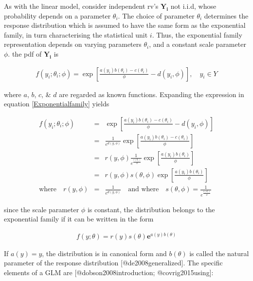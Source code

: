\documentclass[]{article}
\begin{document}
As with the linear model, consider independent rv's \(\mathbf{Y_i}\) not
i.i.d, whose probability depends on a parameter \(\theta_i\). The choice
of parameter \(\theta_i\) determines the response distribution which is
assumed to have the same form as the exponential family, in turn
characterising the statistical unit \(i\). Thus, the exponential family
representation depends on varying parameters \(\theta_i\), and a
constant scale parameter \(\phi\). the pdf of \(\mathbf{Y_i}\) is

\singlespacing

\begin{eqnarray}\label{Exponentialfamily}
f(y_i;\theta_i;\phi) = \exp\left[\frac{a(y_i)b(\theta_i) -c(\theta_i)}{\phi}-d(y_i,\phi)\right], \quad y_i \in Y 
\end{eqnarray} \doublespacing

where \(a\), \(b\), \(c\), \& \(d\) are regarded as known functions.
Expanding the expression in equation \ref{Exponentialfamily} yields

\singlespacing

\begin{eqnarray}\label{Exponentialfamilies}
f(y_i;\theta_i;\phi) &=& \exp\left[\frac{a(y_i)b(\theta_i) -c(\theta_i)}{\phi}-d(y_i,\phi)\right] \nonumber\\
 &=& \frac{1}{e^{d(y,\phi)}}\exp\left[\frac{a(y_i)b(\theta_i) -c(\theta_i)}{\phi}\right] \nonumber\\
 &=& r(y,\phi)\frac{1}{e^{\frac{c(\theta_i)}{\phi}}}\exp\left[\frac{a(y_i)b(\theta_i)}{\phi}\right] \nonumber\\
 &=& r(y,\phi)s(\theta,\phi)\exp\left[\frac{a(y_i)b(\theta_i)}{\phi}\right]\\
 \mbox{where} \quad r(y,\phi) &=& \frac{1}{e^{d(y,\phi)}}\quad \mbox{and where}\quad s(\theta,\phi) = \frac{1}{e^{\frac{c(\theta_i)}{\phi}}}\nonumber
\end{eqnarray} \doublespacing

since the scale parameter \(\phi\) is constant, the distribution belongs
to the exponential family if it can be written in the form

\singlespacing

\begin{eqnarray}\label{Exponential}
f(y;\theta) = r(y)s(\theta)\mathbf{e}^{a(y)b(\theta)}
\end{eqnarray} \doublespacing

If \(a(y) = y\), the distribution is in canonical form and \(b(\theta)\)
is called the natural parameter of the response distribution
{[}@de2008generalized{]}. The specific elements of a GLM are
{[}@dobson2008introduction; @covrig2015using{]}:
\end{document}
